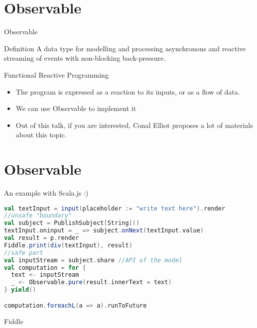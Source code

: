 \documentclass[presentation]{beamer}
\let\oldcite\cite
\renewcommand{\cite}[1]{{\color{blue}\oldcite{#1}}}
\begin{document}
\section{Observable}
\begin{frame}[fragile]{Observable}
\begin{block}{Definition}
A data type for modelling and processing asynchronous and reactive streaming of events with non-blocking back-pressure.
\end{block}
\begin{block}{Functional Reactive Programming \cite{wiki:functional} \cite{blackheath2016functional}}
\begin{itemize}
\item The program is expressed as a reaction to its inputs, or as a flow of data.
\item We can use Observable to implement it
\item Out of this talk, if you are interested, Conal Elliot \href{http://conal.net/}{\faExternalLink} proposes a lot of materials about this topic.
\end{itemize}
\end{block}
\end{frame}
\section{Observable}
\begin{frame}[fragile]{An example with Scala.js :)}
\begin{lstlisting}[language=Scala]
val textInput = input(placeholder := "write text here").render
//unsafe "boundary"
val subject = PublishSubject[String]() 
textInput.oninput = _ => subject.onNext(textInput.value)
val result = p.render
Fiddle.print(div(textInput), result)
//safe part
val inputStream = subject.share //API of the model
val computation = for {
  text <- inputStream
  _ <- Observable.pure(result.innerText = text)
} yield()

computation.foreachL(a => a).runToFuture
\end{lstlisting}  
\begin{center}
Fiddle \href{https://scalafiddle.io/sf/0uDr1Cr/1}{\faExternalLink}
\end{center}
\end{frame}
\end{document}
